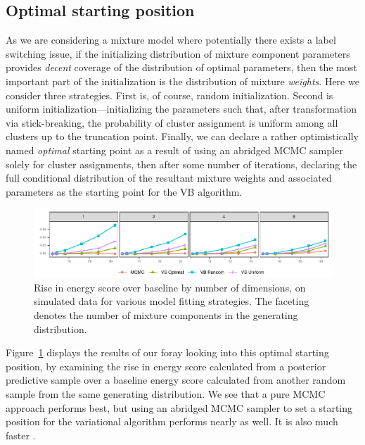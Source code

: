 \subsection{Optimal starting position}

As we are considering a mixture model where potentially there exists a label switching
    issue, if the initializing distribution of mixture component parameters provides
    \emph{decent} coverage of the distribution of optimal parameters, then the most 
    important part of the initialization is the distribution of mixture \emph{weights}.  
    Here we consider three strategies.  First is, of course, random initialization.  
    Second is uniform initialization---initializing the parameters such that, after
    transformation via stick-breaking, the probability of cluster assignment is uniform
    among all clusters up to the truncation point.  Finally, we can declare a rather
    optimistically named \emph{optimal} starting point as a result of using an abridged
    MCMC sampler solely for cluster assignments, then after some number of iterations,
    declaring the full conditional distribution of the resultant mixture weights and
    associated parameters as the starting point for the VB algorithm.

\begin{figure}[b]
    \caption{Rise in energy score over baseline by number of dimensions, on simulated data for various model fitting strategies. The faceting denotes the number of mixture components in
    the generating distribution. \label{fig:energyscore}}
    \includegraphics[width=\linewidth]{plots/energy_score}
\end{figure}

Figure~\ref{fig:energyscore} displays the results of our foray looking into this 
    optimal starting position, by examining the rise in energy score calculated from a
    posterior predictive sample over a baseline energy score calculated from
    another random sample from the same generating distribution.  We see that a pure 
    MCMC approach performs best, but using an abridged MCMC sampler to set a 
    starting position for the variational algorithm performs nearly as well.  It is
    also much faster .

